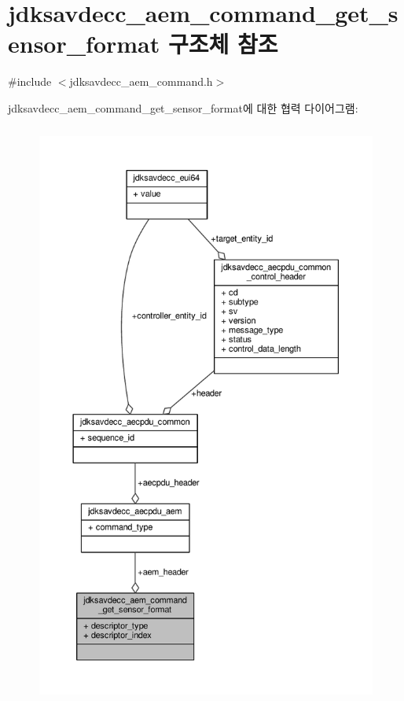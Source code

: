 \hypertarget{structjdksavdecc__aem__command__get__sensor__format}{}\section{jdksavdecc\+\_\+aem\+\_\+command\+\_\+get\+\_\+sensor\+\_\+format 구조체 참조}
\label{structjdksavdecc__aem__command__get__sensor__format}


{\ttfamily \#include $<$jdksavdecc\+\_\+aem\+\_\+command.\+h$>$}



jdksavdecc\+\_\+aem\+\_\+command\+\_\+get\+\_\+sensor\+\_\+format에 대한 협력 다이어그램\+:
\nopagebreak
\begin{figure}[H]
\begin{center}
\leavevmode
\includegraphics[height=550pt]{structjdksavdecc__aem__command__get__sensor__format__coll__graph}
\end{center}
\end{figure}
